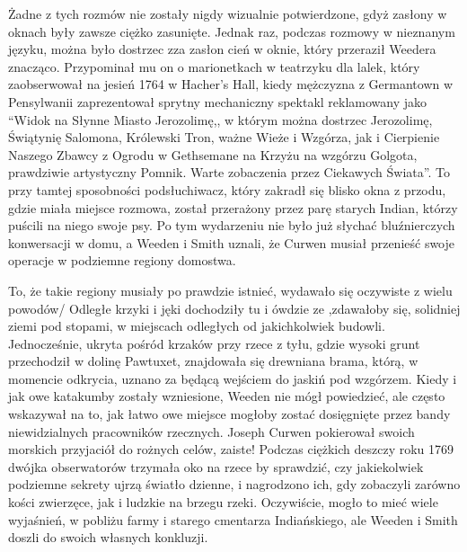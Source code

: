 Żadne z tych rozmów nie zostały nigdy wizualnie potwierdzone, gdyż zasłony w oknach były zawsze ciężko zasunięte. Jednak raz, podczas rozmowy w nieznanym języku, można było dostrzec zza zasłon cień w oknie, który przeraził Weedera znacząco. Przypominał mu on o marionetkach w teatrzyku dla lalek, który zaobserwował na jesień 1764 w Hacher's Hall, kiedy mężczyzna z Germantown w Pensylwanii zaprezentował sprytny mechaniczny spektakl reklamowany jako ``Widok na Słynne Miasto Jerozolimę,, w którym można dostrzec Jerozolimę, Świątynię Salomona, Królewski Tron, ważne Wieże i Wzgórza, jak i Cierpienie Naszego Zbawcy z Ogrodu w Gethsemane na Krzyżu na wzgórzu Golgota, prawdziwie artystyczny Pomnik. Warte zobaczenia przez Ciekawych Świata''. To przy tamtej sposobności podsłuchiwacz, który zakradł się blisko okna z przodu, gdzie miała miejsce rozmowa, został przerażony przez parę starych Indian, którzy puścili na niego swoje psy. Po tym wydarzeniu nie było już słychać bluźnierczych konwersacji w domu, a Weeden i Smith uznali, że Curwen musiał przenieść swoje operacje w podziemne regiony domostwa.

To, że takie regiony musiały po prawdzie istnieć, wydawało się oczywiste z wielu powodów/ Odległe krzyki i jęki dochodziły tu i ówdzie ze ,zdawałoby się, solidniej ziemi pod stopami, w miejscach odległych od jakichkolwiek budowli. Jednocześnie, ukryta pośród krzaków przy rzece z tyłu, gdzie wysoki grunt przechodził w dolinę Pawtuxet, znajdowała się drewniana brama, którą, w momencie odkrycia, uznano za będącą wejściem do jaskiń pod wzgórzem. Kiedy i jak owe katakumby zostały wzniesione, Weeden nie mógł powiedzieć, ale często wskazywał na to, jak łatwo owe miejsce mogłoby zostać dosięgnięte przez bandy niewidzialnych pracowników rzecznych. Joseph Curwen pokierował swoich morskich przyjaciół do rożnych celów, zaiste! Podczas ciężkich deszczy roku 1769 dwójka obserwatorów trzymała oko na rzece by sprawdzić, czy jakiekolwiek podziemne sekrety ujrzą światło dzienne, i nagrodzono ich, gdy zobaczyli zarówno kości zwierzęce, jak i ludzkie na brzegu rzeki. Oczywiście, mogło to mieć wiele wyjaśnień, w pobliżu farmy i starego cmentarza Indiańskiego, ale Weeden i Smith doszli do swoich własnych konkluzji. 

